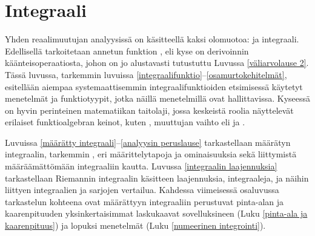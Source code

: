 
\chapter{Integraali}
\label{Integraali}

Yhden reaalimuutujan analyysissä on  käsitteellä kaksi olomuotoa:
 ja  integraali. Edellisellä tarkoitetaan
annetun funktion , eli kyse on derivoinnin käänteisoperaatiosta,
johon on jo alustavasti tutustuttu Luvussa \ref{väliarvolause 2}. Tässä luvussa, tarkemmin
luvuissa \ref{integraalifunktio}--\ref{osamurtokehitelmät}, esitellään aiempaa
systemaattisemmin integraalifunktioiden etsimisessä käytetyt  menetelmät ja funktiotyypit,
jotka näillä menetelmillä ovat hallittavissa. Kyseessä on hyvin perinteinen matematiikan
taitolaji, jossa keskeistä roolia näyttelevät erilaiset funktioalgebran keinot, kuten
, muuttujan vaihto eli  ja .

Luvuissa \ref{määrätty integraali}--\ref{analyysin peruslause} tarkastellaan määrätyn
integraalin, tarkemmin , eri määrittelytapoja ja ominaisuuksia
sekä liittymistä määräämättömään integraaliin  kautta.
Luvussa \ref{integraalin laajennuksia} tarkastellaan Riemannin integraalin käsitteen
laajennuksia,  integraaleja, ja näihin liittyen integraalien ja sarjojen
vertailua. Kahdessa viimeisessä osaluvussa tarkastelun kohteena ovat määrättyyn integraaliin
perustuvat pinta-alan ja kaarenpituuden yksinkertaisimmat laskukaavat sovelluksineen
(Luku \ref{pinta-ala ja kaarenpituus}) ja lopuksi  menetelmät
(Luku \ref{numeerinen integrointi}). 